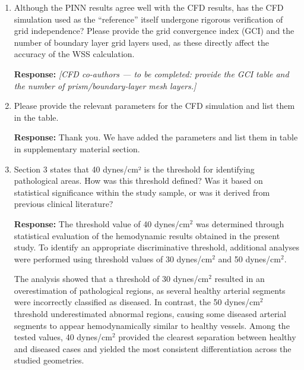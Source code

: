 \documentclass[11pt]{article}
\begin{document}
\begin{enumerate}[]
Future studies will incorporate lumped‑parameter networks (LPN) to improve quantitative accuracy. Nevertheless, the combination of literature‑based flow rates, outlet clipping, and careful interpretation ensures reliable comparative WSS distributions. This limitation is explicitly stated in the revised manuscript.

    \item Although the PINN results agree well with the CFD results, has the CFD simulation used as the ``reference'' itself undergone rigorous verification of grid independence? Please provide the grid convergence index (GCI) and the number of boundary layer grid layers used, as these directly affect the accuracy of the WSS calculation.

    \textbf{Response:} \textit{[CFD co-authors --- to be completed: provide the GCI table and the number of prism/boundary-layer mesh layers.]}
    \vspace{2cm}

    \item Please provide the relevant parameters for the CFD simulation and list them in the table.

    \textbf{Response:} Thank you. We have added the parameters and list them in table in supplementary material section.

    \item Section 3 states that 40 dynes/cm² is the threshold for identifying pathological areas. How was this threshold defined? Was it based on statistical significance within the study sample, or was it derived from previous clinical literature?

    \textbf{Response:} The threshold value of 40 dynes/cm$^{2}$ was determined through statistical evaluation of the hemodynamic results obtained in the present study. To identify an appropriate discriminative threshold, additional analyses were performed using threshold values of 30 dynes/cm$^{2}$ and 50 dynes/cm$^{2}$.

The analysis showed that a threshold of 30 dynes/cm$^{2}$ resulted in an overestimation of pathological regions, as several healthy arterial segments were incorrectly classified as diseased. In contrast, the 50 dynes/cm$^{2}$ threshold underestimated abnormal regions, causing some diseased arterial segments to appear hemodynamically similar to healthy vessels. Among the tested values, 40 dynes/cm$^{2}$ provided the clearest separation between healthy and diseased cases and yielded the most consistent differentiation across the studied geometries.


\end{enumerate}
\end{document}
